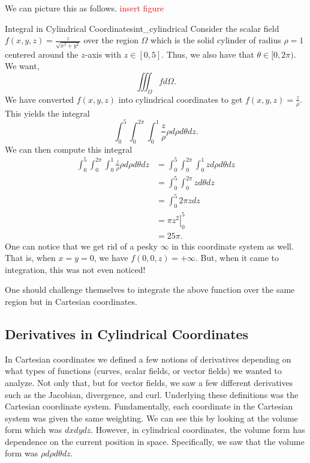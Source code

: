 We can picture this as follows. \textcolor{red}{insert figure}

\begin{ex}{Integral in Cylindrical Coordinates}{int_cylindrical}
    Consider the scalar field $f(x,y,z) = \frac{z}{\sqrt{x^2+y^2}}$ over the region $\Omega$ which is the solid cylinder of radius $\rho=1$ centered around the $z$-axis with $z\in [0,5]$. Thus, we also have that $\theta \in [0,2\pi)$. We want,
    \[
    \iiint_\Omega f d\Omega.
    \]
    We have converted $f(x,y,z)$ into cylindrical coordinates to get $f(x,y,z) = \frac{z}{\rho}$.  This yields the integral
    \[
    \int_0^5 \int_0^{2\pi} \int_0^1 \frac{z}{\rho} \rho d\rho d\theta dz.
    \]
    We can then compute this integral
    \begin{align*}
        \int_0^5 \int_0^{2\pi} \int_0^1 \frac{z}{\rho} \rho d\rho d\theta dz &= \int_0^5 \int_0^{2\pi} \int_0^1 z d\rho d\theta dz \\
        &= \int_0^5 \int_0^{2\pi} z d\theta dz \\
        &= \int_0^5 2\pi z dz\\
        &= \left. \pi z^2 \right|_0^5\\
        &= 25 \pi.
    \end{align*}
    One can notice that we get rid of a pesky $\infty$ in this coordinate system as well.  That is, when $x=y=0$, we have $f(0,0,z)=+\infty$.  But, when it came to integration, this was not even noticed!
\end{ex}

\begin{exercise}
    One should challenge themselves to integrate the above function over the same region but in Cartesian coordinates.
\end{exercise}

\subsection{Derivatives in Cylindrical Coordinates}

In Cartesian coordinates we defined a few notions of derivatives depending on what types of functions (curves, scalar fields, or vector fields) we wanted to analyze.  Not only that, but for vector fields, we saw a few different derivatives such as the Jacobian, divergence, and curl.  Underlying these definitions was the Cartesian coordinate system.  Fundamentally, each coordinate in the Cartesian system was given the same weighting. We can see this by looking at the volume form which was $dxdydz$.  However, in cylindrical coordinates, the volume form has dependence on the current position in space.  Specifically, we saw that the volume form was $\rho d\rho d\theta dz$. 

